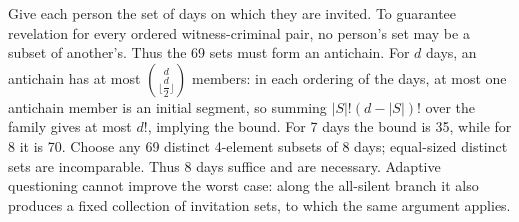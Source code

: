 Give each person the set of days on which they are invited. To guarantee revelation for every ordered witness-criminal pair, no person's set may be a subset of another's. Thus the 69 sets must form an antichain. For $d$ days, an antichain has at most $\binom d{\lfloor \dfrac{d}{2}\rfloor}$ members: in each ordering of the days, at most one antichain member is an initial segment, so summing $|S|!(d-|S|)!$ over the family gives at most $d!$, implying the bound. For 7 days the bound is 35, while for 8 it is 70. Choose any 69 distinct 4-element subsets of 8 days; equal-sized distinct sets are incomparable. Thus $\boxed8$ days suffice and are necessary. Adaptive questioning cannot improve the worst case: along the all-silent branch it also produces a fixed collection of invitation sets, to which the same argument applies.
